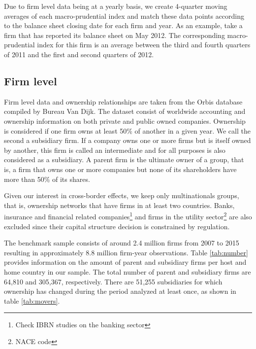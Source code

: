 \documentclass[12pt]{article}
\begin{document}
	Due to firm level data being at a yearly basis, we create 4-quarter moving averages of each macro-prudential index and match these data points according to the balance sheet closing date for each firm and year. As an example, take a firm that has reported its balance sheet on May 2012. The corresponding macro-prudential index for this firm is an average between the third and fourth quarters of 2011 and the first and second quarters of 2012. 
	  
	\subsection{Firm level} \label{subsec:firm}
	Firm level data and ownership relationships are taken from the Orbis database compiled by Bureau Van Dijk.	The dataset consist of worldwide accounting and ownership information on both private and public owned companies. Ownership is considered if one firm owns at least 50\% of another in a given year. We call the second a subsidiary firm. If a company owns one or more firms but is itself owned by another, this firm is called an intermediate and for all purposes is also considered as a subsidiary. A parent firm is the ultimate owner of a group, that is, a firm that owns one or more companies but none of its shareholders have more than 50\% of its shares.
	
	Given our interest in cross-border effects, we keep only multinationals groups, that is, ownership networks that have firms in at least two countries. Banks, insurance and financial related companies\footnote{Check IBRN studies on the banking sector} and firms in the utility sector\footnote{NACE code} are also excluded since their capital structure decision is constrained by regulation.
	
	The benchmark sample consists of around 2.4 million firms from 2007 to 2015 resulting in approximately 8.8 million firm-year observations. Table \ref{tab:number} provides information on the amount of parent and subsidiary firms per host and home country in our sample. The total number of parent and subsidiary firms are 64,810 and 305,367, respectively. There are 51,255 subsidiaries for which ownership has changed during the period analyzed at least once, as shown in table \ref{tab:movers}.
	
\end{document}
